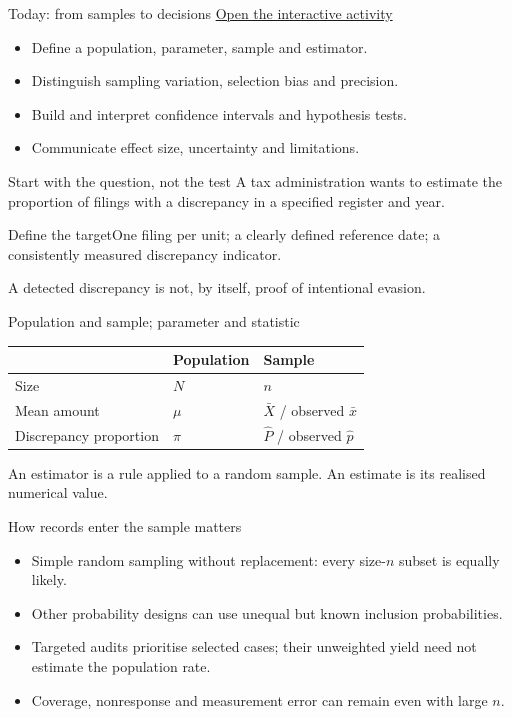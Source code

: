\begin{frame}{Today: from samples to decisions}
\href{https://silviasaliniunimi.github.io/data-analysis-tax-compliance/03-inference.html}{Open the interactive activity}\par
\begin{itemize}
\item Define a population, parameter, sample and estimator.
\item Distinguish sampling variation, selection bias and precision.
\item Build and interpret confidence intervals and hypothesis tests.
\item Communicate effect size, uncertainty and limitations.
\end{itemize}
\end{frame}
\begin{frame}{Start with the question, not the test}
A tax administration wants to estimate the proportion of filings with a discrepancy in a specified register and year.
\begin{block}{Define the target}One filing per unit; a clearly defined reference date; a consistently measured discrepancy indicator.\end{block}
A detected discrepancy is not, by itself, proof of intentional evasion.
\end{frame}
\begin{frame}{Population and sample; parameter and statistic}
\begin{center}\begin{tabular}{lll}\toprule
 & Population & Sample\\\midrule
Size & $N$ & $n$\\
Mean amount & $\mu$ & $\bar X$ / observed $\bar x$\\
Discrepancy proportion & $\pi$ & $\hat P$ / observed $\hat p$\\\bottomrule
\end{tabular}\end{center}
An \alert{estimator} is a rule applied to a random sample. An \alert{estimate} is its realised numerical value.
\end{frame}
\begin{frame}{How records enter the sample matters}
\begin{itemize}
\item Simple random sampling without replacement: every size-$n$ subset is equally likely.
\item Other probability designs can use unequal but known inclusion probabilities.
\item Targeted audits prioritise selected cases; their unweighted yield need not estimate the population rate.
\item Coverage, nonresponse and measurement error can remain even with large $n$.
\end{itemize}
\end{frame}
